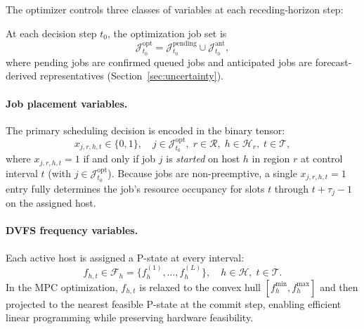 \documentclass[a4paper,fleqn]{cas-dc}
\begin{document}
The optimizer controls three classes of variables at each receding-horizon step:

At each decision step $t_0$, the optimization job set is
\[
\mathcal{J}^{\mathrm{opt}}_{t_0} = \mathcal{J}^{\mathrm{pending}}_{t_0} \cup \mathcal{J}^{\mathrm{ant}}_{t_0},
\]
where pending jobs are confirmed queued jobs and anticipated jobs are forecast-derived representatives (Section~\ref{sec:uncertainty}).

\paragraph{Job placement variables.}
The primary scheduling decision is encoded in the binary tensor:
\begin{equation}
x_{j,r,h,t} \in \{0,1\}, \quad j \in \mathcal{J}^{\mathrm{opt}}_{t_0},\; r \in \mathcal{R},\; h \in \mathcal{H}_r,\; t \in \mathcal{T},
\end{equation}
where $x_{j,r,h,t}=1$ if and only if job $j$ is \emph{started} on host $h$ in region $r$ at control interval $t$ (with $j \in \mathcal{J}^{\mathrm{opt}}_{t_0}$). Because jobs are non-preemptive, a single $x_{j,r,h,t}=1$ entry fully determines the job's resource occupancy for slots $t$ through $t + \tau_j - 1$ on the assigned host.

\paragraph{DVFS frequency variables.}
Each active host is assigned a P-state at every interval:
\begin{equation}
f_{h,t} \in \mathcal{F}_h = \{f^{(1)}_h, \ldots, f^{(L)}_h\}, \quad h \in \mathcal{H},\; t \in \mathcal{T}.
\end{equation}
In the MPC optimization, $f_{h,t}$ is relaxed to the convex hull $[f^{\min}_h, f^{\max}_h]$ and then projected to the nearest feasible P-state at the commit step, enabling efficient linear programming while preserving hardware feasibility.
\end{document}
